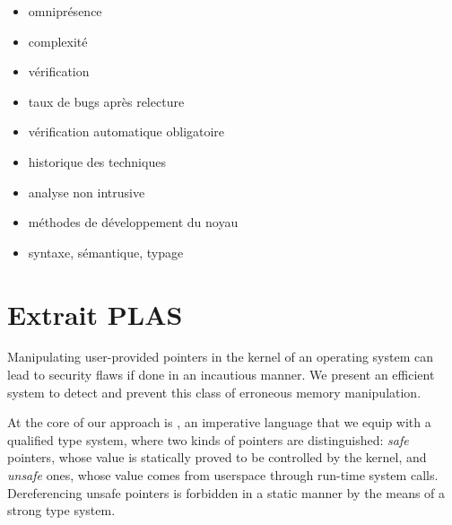 \begin{itemize}
\item
  omniprésence
\item
  complexité
\item
  vérification
\item
  taux de bugs après relecture
\item
  vérification automatique obligatoire
\item
  historique des techniques
\item
  analyse non intrusive
\item
  méthodes de développement du noyau
\item
  syntaxe, sémantique, typage
\end{itemize}
























































\clearpage

\section*{Extrait PLAS}
Manipulating user-provided pointers in the kernel of an operating system can
lead to security flaws if done in an incautious manner. We present an efficient
system to detect and prevent this class of erroneous memory manipulation.

At the core of our approach is \langname, an imperative language that we equip
with a qualified type system, where two kinds of pointers are distinguished:
\emph{safe} pointers, whose value is statically proved to be controlled by the
kernel, and \emph{unsafe} ones, whose value comes from userspace through
run-time system calls. Dereferencing unsafe pointers is forbidden in a static
manner by the means of a strong type system.

